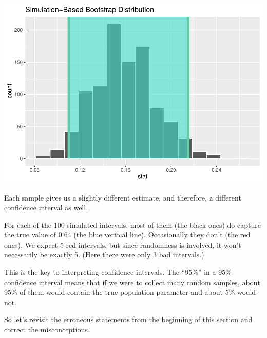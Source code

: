 \documentclass[
]{book}
\begin{document}
\includegraphics{intro_stats_files/figure-latex/unnamed-chunk-333-1.pdf}

Each sample gives us a slightly different estimate, and therefore, a different confidence interval as well.

For each of the 100 simulated intervals, most of them (the black ones) do capture the true value of 0.64 (the blue vertical line). Occasionally they don't (the red ones). We expect 5 red intervals, but since randomness is involved, it won't necessarily be exactly 5. (Here there were only 3 bad intervals.)

This is the key to interpreting confidence intervals. The ``95\%'' in a 95\% confidence interval means that if we were to collect many random samples, about 95\% of them would contain the true population parameter and about 5\% would not.

So let's revisit the erroneous statements from the beginning of this section and correct the misconceptions.
\end{document}
